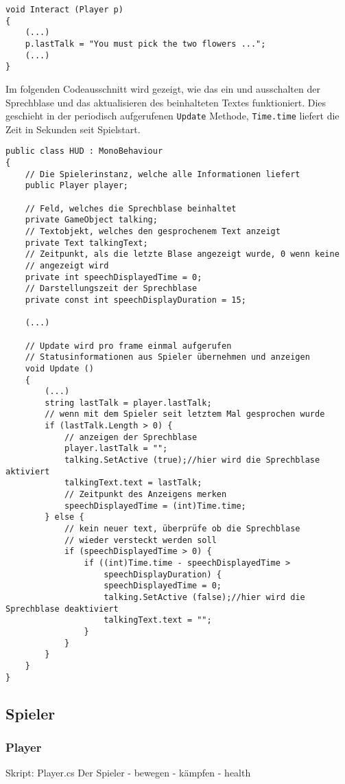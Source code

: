 \begin{lstlisting}[caption={Kommunikation setzen}]
void Interact (Player p)
{
	(...)
	p.lastTalk = "You must pick the two flowers ...";
	(...)
}
\end{lstlisting}

Im folgenden Codeausschnitt wird gezeigt, wie das ein und ausschalten der Sprechblase und  das aktualisieren des beinhalteten Textes funktioniert. Dies geschieht in der periodisch aufgerufenen \lstinline{Update} Methode, \lstinline{Time.time} liefert die Zeit in Sekunden seit Spielstart.

\begin{lstlisting}[caption={Sprechblase ein- und ausblenden}]
public class HUD : MonoBehaviour
{
	// Die Spielerinstanz, welche alle Informationen liefert
	public Player player;

	// Feld, welches die Sprechblase beinhaltet
	private GameObject talking;
	// Textobjekt, welches den gesprochenem Text anzeigt
	private Text talkingText;
	// Zeitpunkt, als die letzte Blase angezeigt wurde, 0 wenn keine 
	// angezeigt wird
	private int speechDisplayedTime = 0;
	// Darstellungszeit der Sprechblase
	private const int speechDisplayDuration = 15;

	(...)
	
	// Update wird pro frame einmal aufgerufen
	// Statusinformationen aus Spieler übernehmen und anzeigen
	void Update ()
	{
		(...)
		string lastTalk = player.lastTalk;
		// wenn mit dem Spieler seit letztem Mal gesprochen wurde
		if (lastTalk.Length > 0) {
			// anzeigen der Sprechblase
			player.lastTalk = "";
			talking.SetActive (true);//hier wird die Sprechblase aktiviert
			talkingText.text = lastTalk;
			// Zeitpunkt des Anzeigens merken
			speechDisplayedTime = (int)Time.time;
		} else {
			// kein neuer text, überprüfe ob die Sprechblase 
			// wieder versteckt werden soll
			if (speechDisplayedTime > 0) {
				if ((int)Time.time - speechDisplayedTime > 
					speechDisplayDuration) {
					speechDisplayedTime = 0;
					talking.SetActive (false);//hier wird die Sprechblase deaktiviert
					talkingText.text = "";
				}
			}
		}	
	}
}
\end{lstlisting}


\subsection{Spieler}

\subsubsection{Player}
Skript: Player.cs
Der Spieler
- bewegen
- kämpfen
- health


